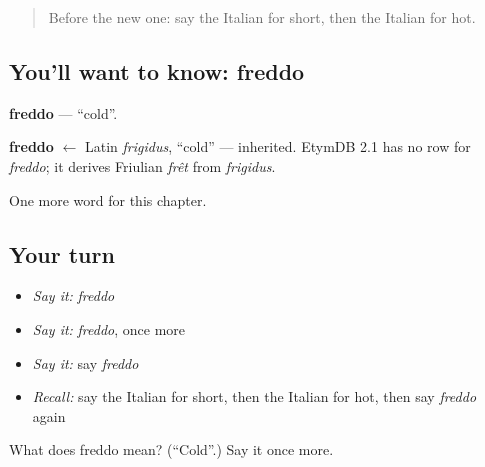 \begin{quote}
Before the new one: say the Italian for short, then the Italian for hot.
\end{quote}

\subsection*{You'll want to know: freddo}
\textbf{freddo} — \textquotedblleft{}cold\textquotedblright{}.

\begin{cousinweb}
\textbf{freddo} $\leftarrow$ Latin \emph{frigidus}, \textquotedblleft{}cold\textquotedblright{} — inherited. EtymDB 2.1 has no row for \emph{freddo}; it derives Friulian \emph{frêt} from \emph{frigidus}.
\end{cousinweb}

\begin{grammarlens}[title={What you've built}]
One more word for this chapter.
\end{grammarlens}

\subsection*{Your turn}
\begin{itemize}
\raggedright
  \item \emph{Say it:} \emph{freddo}
  \item \emph{Say it:} \emph{freddo}, once more
  \item \emph{Say it:} say \emph{freddo}
  \item \emph{Recall:} say the Italian for short, then the Italian for hot, then say \emph{freddo} again
\end{itemize}

\begin{tcolorbox}[breakable,colback=teal!4,colframe=teal!35!black,title={Before you move on}]
What does freddo mean? (\textquotedblleft{}Cold\textquotedblright{}.) Say it once more.
\end{tcolorbox}
